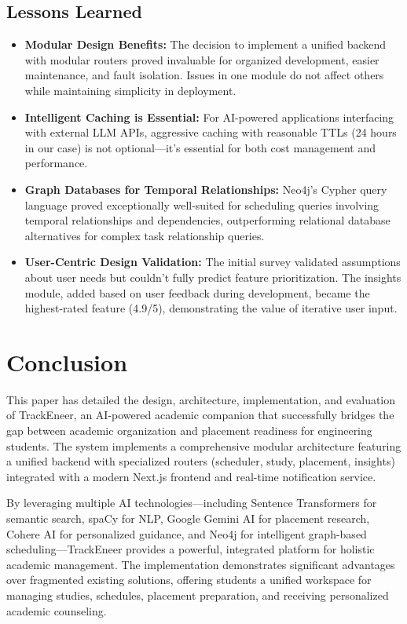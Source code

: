 \documentclass[conference]{IEEEtran}
\begin{document}
\subsection{Lessons Learned}
\begin{itemize}
    \item \textbf{Modular Design Benefits:} The decision to implement a unified backend with modular routers proved invaluable for organized development, easier maintenance, and fault isolation. Issues in one module do not affect others while maintaining simplicity in deployment.
    \item \textbf{Intelligent Caching is Essential:} For AI-powered applications interfacing with external LLM APIs, aggressive caching with reasonable TTLs (24 hours in our case) is not optional—it's essential for both cost management and performance.
    \item \textbf{Graph Databases for Temporal Relationships:} Neo4j's Cypher query language proved exceptionally well-suited for scheduling queries involving temporal relationships and dependencies, outperforming relational database alternatives for complex task relationship queries.
    \item \textbf{User-Centric Design Validation:} The initial survey validated assumptions about user needs but couldn't fully predict feature prioritization. The insights module, added based on user feedback during development, became the highest-rated feature (4.9/5), demonstrating the value of iterative user input.
\end{itemize}

\section{Conclusion}
This paper has detailed the design, architecture, implementation, and evaluation of TrackEneer, an AI-powered academic companion that successfully bridges the gap between academic organization and placement readiness for engineering students. The system implements a comprehensive modular architecture featuring a unified backend with specialized routers (scheduler, study, placement, insights) integrated with a modern Next.js frontend and real-time notification service.

By leveraging multiple AI technologies—including Sentence Transformers for semantic search, spaCy for NLP, Google Gemini AI for placement research, Cohere AI for personalized guidance, and Neo4j for intelligent graph-based scheduling—TrackEneer provides a powerful, integrated platform for holistic academic management. The implementation demonstrates significant advantages over fragmented existing solutions, offering students a unified workspace for managing studies, schedules, placement preparation, and receiving personalized academic counseling.
\end{document}
